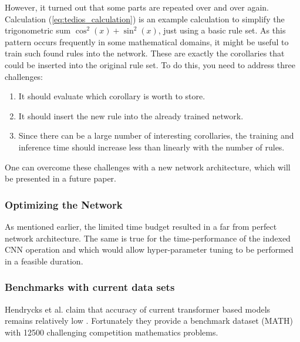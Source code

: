 \documentclass{scrartcl}
\theoremstyle{definition}
\begin{document}
However, it turned out that some parts are repeated over and over again.
{Calculation (\ref{eq:tedios_calculation})} is an example calculation to simplify the trigonometric sum $\cos^2(x)+\sin^2(x)$, just using a basic rule set.
As this pattern occurs frequently in some mathematical domains, it might be useful to train such found rules into the network.   
These are exactly the corollaries that could be inserted into the original rule set.
To do this, you need to address three challenges:

\begin{enumerate}[label=(\roman*)]
	\item It should evaluate which corollary is worth to store.
	\item It should insert the new rule into the already trained network.
	\item Since there can be a large number of interesting corollaries, the training and inference time should increase less than linearly with the number of rules.
\end{enumerate}

One can overcome these challenges with a new network architecture, which will be presented in a future paper.

\subsubsection{Optimizing the Network}

As mentioned earlier, the limited time budget resulted in a far from perfect network architecture.
The same is true for the time-performance of the indexed CNN operation and which would allow hyper-parameter tuning to be performed in a feasible duration.

\subsubsection{Benchmarks with current data sets}

Hendrycks et al. claim that accuracy of current transformer based models remains relatively low \cite{hendrycks2021measuring}.
Fortunately they provide a benchmark dataset (MATH) with 12500 challenging competition mathematics problems.
\end{document}
